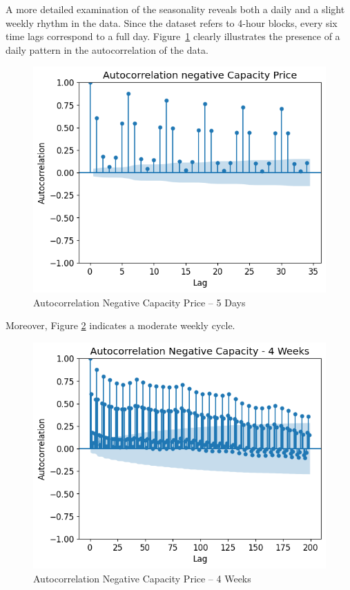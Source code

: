 A more detailed examination of the seasonality reveals both a daily
and a slight weekly rhythm in the data. Since the dataset refers to 4-hour blocks, every six time lags
correspond to a full day. Figure~\ref{fig:Autocorrelation Negative Capacity Price - 5 Days}
clearly illustrates the presence of a daily pattern in the autocorrelation of the data.

\begin{figure}[!h]
	\includegraphics[width=0.7\linewidth]{pictures/Autocorrelation negative Capacity Price.png}
	\caption{Autocorrelation Negative Capacity Price – 5 Days}
	\label{fig:Autocorrelation Negative Capacity Price - 5 Days}
\end{figure}

Moreover, Figure \ref{fig:AutocorrNegCap4Weeks} indicates a moderate weekly cycle.

\begin{figure}[!h]
	\includegraphics[width=0.7\linewidth]{pictures/Autocorrelation Negative Capacity - 4 Weeks.png}
	\caption{Autocorrelation Negative Capacity Price – 4 Weeks}
	\label{fig:AutocorrNegCap4Weeks}
\end{figure}

